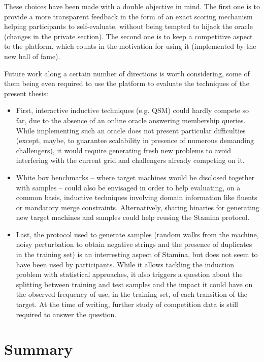 These choices have been made with a double objective in mind. The first one is to provide a more transparent feedback in the form of an exact scoring mechanism helping participants to self-evaluate, without being tempted to hijack the oracle (changes in the private section). The second one is to keep a competitive aspect to the platform, which counts in the motivation for using it (implemented by the new hall of fame). 

Future work along a certain number of directions is worth considering, some of them being even required to use the platform to evaluate the techniques of the present thesis:

\begin{itemize}

\item First, interactive inductive techniques (e.g. QSM) could hardly compete so far, due to the absence of an online oracle answering membership queries. While implementing such an oracle does not present particular difficulties (except, maybe, to guarantee scalability in presence of numerous demanding challengers), it would require generating fresh new problems to avoid interfering with the current grid and challengers already competing on it. 

\item White box benchmarks -- where target machines would be disclosed together with samples -- could also be envisaged in order to help evaluating, on a common basis, inductive techniques involving domain information like fluents or mandatory merge constraints. Alternatively, sharing binaries for generating new target machines and samples could help reusing the Stamina protocol. 

\item Last, the protocol used to generate samples (random walks from the machine, noisy perturbation to obtain negative strings and the presence of duplicates in the training set) is an interresting aspect of Stamina, but does not seem to have been used by participants. While it allows tackling the induction problem with statistical approaches, it also triggers a question about the splitting between training and test samples and the impact it could have on the observed frequency of use, in the training set, of each transition of the target. At the time of writing, further study of competition data is still required to answer the question.

\end{itemize}

\section*{Summary}


